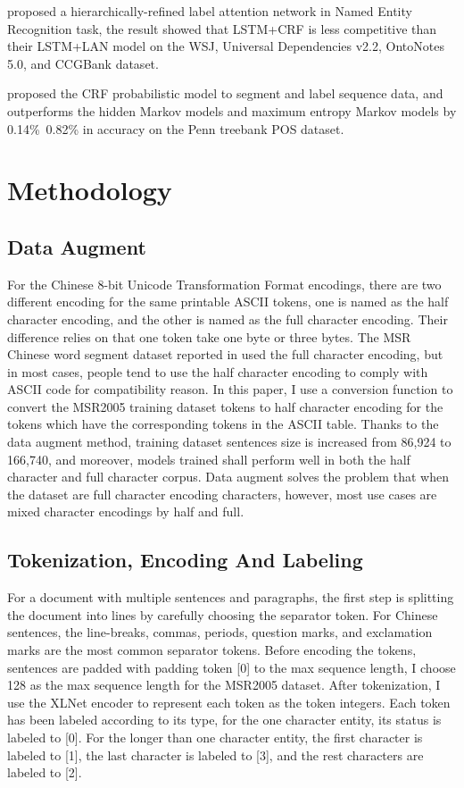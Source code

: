 \documentclass[11pt,a4paper]{article}
\begin{document}
  \citet{cui2019hierarchically} proposed a hierarchically-refined label attention network in Named Entity Recognition task, the result showed that LSTM+CRF is less competitive than their LSTM+LAN model on the WSJ,
Universal Dependencies v2.2, OntoNotes 5.0, and CCGBank dataset.

  \citet{Lafferty2001Conditional} proposed the CRF probabilistic model to segment and label sequence data, and outperforms the hidden Markov models and maximum entropy Markov models by 0.14\%~0.82\% in accuracy on the Penn treebank POS dataset.


\section{Methodology}
\label{sec:hireachy}

\subsection{Data Augment}

For the Chinese 8-bit Unicode Transformation Format encodings, there are two different encoding for the same printable ASCII tokens, one is named as the half character encoding,
and the other is named as the full character encoding.
Their difference relies on that one token take one byte or three bytes.
The MSR Chinese word segment dataset reported in \citet{emerson2005second} used the full character encoding, but in most cases,
people tend to use the half character encoding to comply with ASCII code for compatibility reason.
In this paper, I use a conversion function to convert the MSR2005 training dataset tokens to half character encoding for the tokens which have the corresponding tokens in the ASCII table.
Thanks to the data augment method, training dataset sentences size is increased from 86,924 to 166,740,
and moreover, models trained shall perform well in both the half character and full character corpus.
Data augment solves the problem that when the dataset are full character encoding characters, however, most use cases are mixed character encodings by half and full.

\subsection{Tokenization, Encoding And Labeling}

For a document with multiple sentences and paragraphs, the first step is splitting the document into lines by carefully choosing the separator token.
For Chinese sentences, the line-breaks, commas, periods, question marks, and exclamation marks are the most common separator tokens.
Before encoding the tokens, sentences are padded with padding token [0] to the max sequence length, I choose 128 as the max sequence length for the MSR2005 dataset.
After tokenization, I use the XLNet encoder to represent each token as the token integers.
Each token has been labeled according to its type, for the one character entity, its status is labeled to [0].
For the longer than one character entity, the first character is labeled to [1], the last character is labeled to [3], and the rest characters are labeled to [2].
\end{document}
